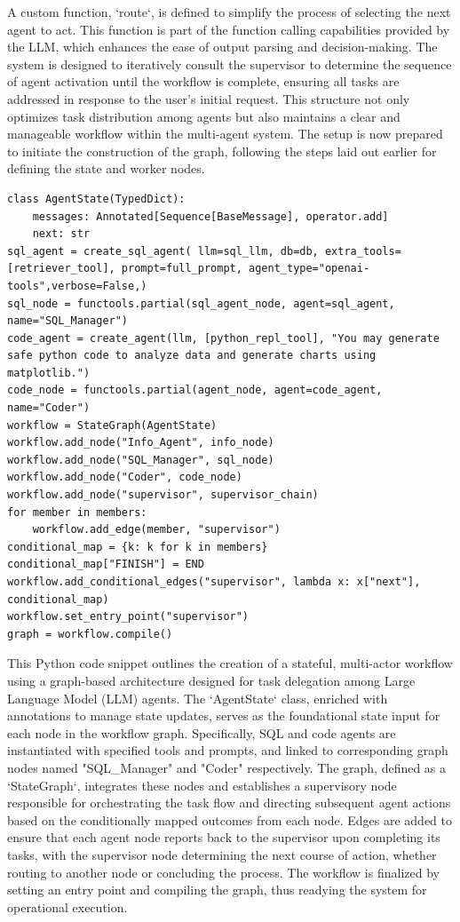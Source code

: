 \begin{bibunit}
A custom function, `route`, is defined to simplify the process of selecting the next agent to act. This function is part of the function calling capabilities provided by the LLM, which enhances the ease of output parsing and decision-making. The system is designed to iteratively consult the supervisor to determine the sequence of agent activation until the workflow is complete, ensuring all tasks are addressed in response to the user's initial request. This structure not only optimizes task distribution among agents but also maintains a clear and manageable workflow within the multi-agent system. The setup is now prepared to initiate the construction of the graph, following the steps laid out earlier for defining the state and worker nodes.

\begin{lstlisting} 
class AgentState(TypedDict):
    messages: Annotated[Sequence[BaseMessage], operator.add]
    next: str
sql_agent = create_sql_agent( llm=sql_llm, db=db, extra_tools=[retriever_tool], prompt=full_prompt, agent_type="openai-tools",verbose=False,)
sql_node = functools.partial(sql_agent_node, agent=sql_agent, name="SQL_Manager")
code_agent = create_agent(llm, [python_repl_tool], "You may generate safe python code to analyze data and generate charts using matplotlib.")
code_node = functools.partial(agent_node, agent=code_agent, name="Coder")
workflow = StateGraph(AgentState)
workflow.add_node("Info_Agent", info_node)
workflow.add_node("SQL_Manager", sql_node)
workflow.add_node("Coder", code_node)
workflow.add_node("supervisor", supervisor_chain)
for member in members:
    workflow.add_edge(member, "supervisor") 
conditional_map = {k: k for k in members}
conditional_map["FINISH"] = END
workflow.add_conditional_edges("supervisor", lambda x: x["next"], conditional_map)
workflow.set_entry_point("supervisor")
graph = workflow.compile()
\end{lstlisting}

This Python code snippet outlines the creation of a stateful, multi-actor workflow using a graph-based architecture designed for task delegation among Large Language Model (LLM) agents. The `AgentState` class, enriched with annotations to manage state updates, serves as the foundational state input for each node in the workflow graph. Specifically, SQL and code agents are instantiated with specified tools and prompts, and linked to corresponding graph nodes named "SQL\_Manager" and "Coder" respectively. The graph, defined as a `StateGraph`, integrates these nodes and establishes a supervisory node responsible for orchestrating the task flow and directing subsequent agent actions based on the conditionally mapped outcomes from each node. Edges are added to ensure that each agent node reports back to the supervisor upon completing its tasks, with the supervisor node determining the next course of action, whether routing to another node or concluding the process. The workflow is finalized by setting an entry point and compiling the graph, thus readying the system for operational execution.



\end{bibunit}
